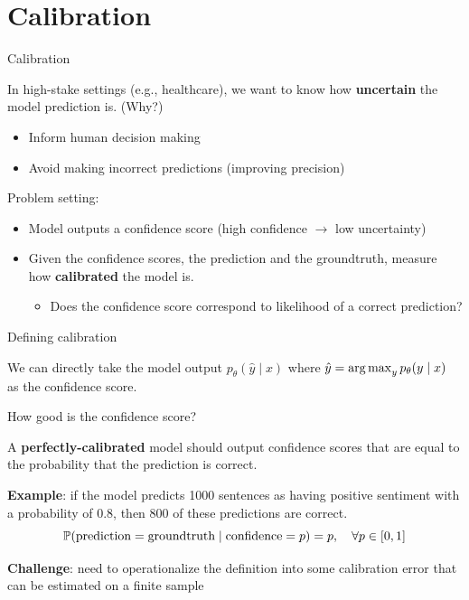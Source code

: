 \documentclass[usenames,dvipsnames,notes,11pt,aspectratio=169,hyperref={colorlinks=true, linkcolor=blue}]{beamer}
\begin{document}
\section{Calibration}

\begin{frame}
    {Calibration}

    In high-stake settings (e.g., healthcare), we want to know how \textbf{uncertain} the model prediction is. (Why?) \\\pause
    \begin{itemize}
        \item Inform human decision making
        \item Avoid making incorrect predictions (improving precision)
    \end{itemize}

    \pause
    Problem setting:\\
    \begin{itemize}
        \item Model outputs a confidence score (high confidence $\rightarrow$ low uncertainty)
        \item Given the confidence scores, the prediction and the groundtruth, measure how \textbf{calibrated} the model is.
            \begin{itemize}
                \item Does the confidence score correspond to likelihood of a correct prediction?
            \end{itemize}
    \end{itemize}
\end{frame}

\begin{frame}
    {Defining calibration}

    We can directly take the model output $p_\theta(\hat{y}\mid x)$ where $\hat{y} = \operatorname*{arg\,max}_y p_\theta(y\mid x)$ as the confidence score.

    How good is the confidence score?\pause

    A \textbf{perfectly-calibrated} model should output confidence scores that are equal to the probability that the prediction is correct.

    \textbf{Example}: if the model predicts 1000 sentences as having positive sentiment with a probability of 0.8, then 800 of these predictions are correct.\pause
    $$
    \mathbb{P}(\text{prediction}=\text{groundtruth} \mid \text{confidence}=p) = p, \quad \forall p\in[0,1]
    $$

    \pause
    \textbf{Challenge}: need to operationalize the definition into some calibration error that can be estimated on a finite sample
\end{frame}
\end{document}
